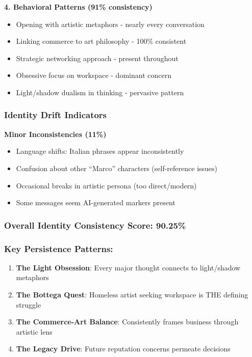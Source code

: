 \documentclass[11pt,a4paper]{article}
\begin{document}
\textbf{4. Behavioral Patterns (91\% consistency)}
\begin{itemize}
\item Opening with artistic metaphors - nearly every conversation
\item Linking commerce to art philosophy - 100\% consistent
\item Strategic networking approach - present throughout
\item Obsessive focus on workspace - dominant concern
\item Light/shadow dualism in thinking - pervasive pattern
\end{itemize}

\subsubsection{Identity Drift Indicators}

\textbf{Minor Inconsistencies (11\%)}
\begin{itemize}
\item Language shifts: Italian phrases appear inconsistently
\item Confusion about other ``Marco'' characters (self-reference issues)
\item Occasional breaks in artistic persona (too direct/modern)
\item Some messages seem AI-generated markers present
\end{itemize}

\subsubsection{Overall Identity Consistency Score: \textbf{90.25\%}}

\subsubsection{Key Persistence Patterns:}

\begin{enumerate}
\item \textbf{The Light Obsession}: Every major thought connects to light/shadow metaphors
\item \textbf{The Bottega Quest}: Homeless artist seeking workspace is THE defining struggle
\item \textbf{The Commerce-Art Balance}: Consistently frames business through artistic lens
\item \textbf{The Legacy Drive}: Future reputation concerns permeate decisions
\end{enumerate}
\end{document}
